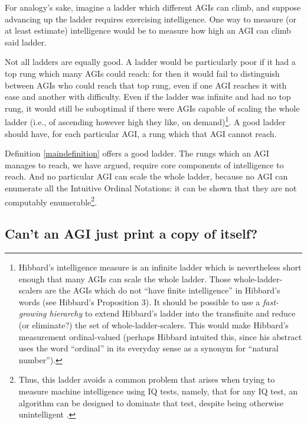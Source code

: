 \documentclass[runningheads]{llncs}
\begin{document}
For analogy's sake, imagine a ladder which different AGIs
can climb, and suppose advancing up the ladder requires exercising
intelligence. One way to measure (or at least estimate) intelligence would be
to measure how high an AGI can climb said ladder.

Not all ladders are equally good. A ladder would be particularly poor if it had
a top rung which many AGIs could reach: for then it would fail to
distinguish between AGIs who could reach that top rung, even if one
AGI reaches it with ease and another with difficulty.
Even if the ladder was infinite and had no top rung, it would still be suboptimal
if there were AGIs capable of scaling the whole
ladder (i.e., of ascending however high they like, on demand)\footnote{Hibbard's
intelligence measure
\cite{hibbard2011measuring} is an infinite ladder
which is nevertheless short enough that many AGIs can
scale the whole ladder. Those whole-ladder-scalers are the AGIs which
do not ``have finite intelligence'' in Hibbard's words
(see Hibbard's Proposition 3). It should be possible to
use a \emph{fast-growing hierarchy}
\cite{fairtlough1998hierarchies} \cite{weiermann2002slow}
to extend Hibbard's ladder into the transfinite and reduce (or eliminate?)
the set of whole-ladder-scalers. This would make
Hibbard's measurement ordinal-valued
(perhaps Hibbard intuited this, since his abstract uses the
word ``ordinal''
in its everyday sense as a synonym for ``natural number'').}.
A good ladder should have, for each particular AGI, a rung which that
AGI cannot reach.

Definition \ref{maindefinition} offers a good ladder.
The rungs which an AGI
manages to reach, we have argued, require core components of intelligence
to reach.
And no particular AGI can scale
the whole ladder,
because no AGI can enumerate all the Intuitive Ordinal Notations: it can
be shown
that they are not computably enumerable\footnote{Thus,
this ladder avoids a common problem that arises when
trying to measure machine intelligence using IQ tests, namely, that for any IQ test,
an algorithm can be designed to dominate that
test, despite being otherwise unintelligent \cite{besold2015can}.}.


\subsection{Can't an AGI just print a copy of itself?}

\end{document}
